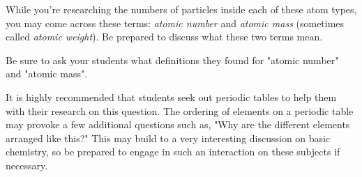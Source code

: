 While you're researching the numbers of particles inside each of these atom types, you may come across these terms: {\it atomic number} and {\it atomic mass} (sometimes called {\it atomic weight}).  Be prepared to discuss what these two terms mean.







Be sure to ask your students what definitions they found for "atomic number" and "atomic mass".

It is highly recommended that students seek out periodic tables to help them with their research on this question.  The ordering of elements on a periodic table may provoke a few additional questions such as, "Why are the different elements arranged like this?"  This may build to a very interesting discussion on basic chemistry, so be prepared to engage in such an interaction on these subjects if necessary.




